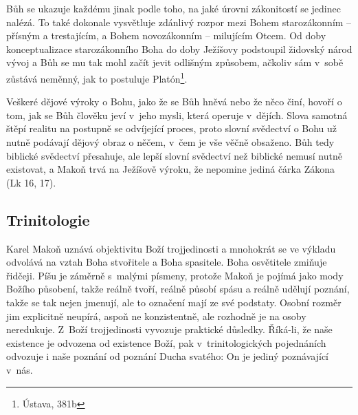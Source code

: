 Bůh se ukazuje každému jinak podle toho, na jaké úrovni zákonitostí se jedinec
nalézá. To také dokonale vysvětluje zdánlivý rozpor mezi Bohem starozákonním --
přísným a trestajícím, a Bohem novozákonním -- milujícím Otcem. Od doby
konceptualizace starozákonního Boha do doby Ježíšovy podstoupil židovský národ
vývoj a Bůh se mu tak mohl začít jevit odlišným způsobem, ačkoliv sám v~sobě
zůstává neměnný, jak to postuluje Platón\footnote{Ústava, 381b}.

Veškeré dějové výroky o Bohu, jako že se Bůh hněvá nebo že něco činí, hovoří o
tom, jak se Bůh člověku jeví v~jeho mysli, která operuje v~dějích. Slova samotná
štěpí realitu na postupně se odvíjející proces, proto slovní svědectví o Bohu už
nutně podávají dějový obraz o něčem, v~čem je vše věčně obsaženo. Bůh tedy
biblické svědectví přesahuje, ale lepší slovní svědectví než biblické nemusí
nutně existovat, a Makoň trvá na Ježíšově výroku, že nepomine jediná čárka
Zákona (Lk 16, 17).

\subsection{Trinitologie}

Karel Makoň uznává objektivitu Boží trojjedinosti a mnohokrát se ve výkladu
odvolává na vztah Boha stvořitele a Boha spasitele. Boha osvětitele zmiňuje
řidčeji. Píšu je záměrně s~malými
písmeny, protože Makoň je pojímá jako mody Božího působení, takže reálně tvoří,
reálně působí spásu a reálně udělují poznání, takže se tak nejen jmenují, ale to označení mají ze své
podstaty. Osobní rozměr jim explicitně neupírá, aspoň ne konzistentně, ale
rozhodně je na osoby neredukuje. Z~Boží trojjedinosti vyvozuje praktické důsledky.
Říká-li, že naše existence je odvozena od existence Boží, pak v~trinitologických
pojednáních odvozuje i naše poznání od poznání Ducha svatého: On je jediný
poznávající v~nás.

